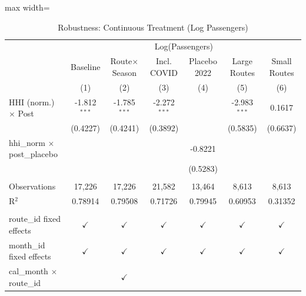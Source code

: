 
\begin{table}[htbp]
   \caption{\label{tab:robust} Robustness: Continuous Treatment (Log Passengers)}
   \bigskip
   \centering
   \begin{adjustbox}{max width=\textwidth}
   \begin{tabular}{lcccccc}
      \toprule
       & \multicolumn{6}{c}{Log(Passengers)}\\
                                          & Baseline       & Route$\times$Season  & Incl. COVID    & Placebo 2022  & Large Routes   & Small Routes \\   
                                          & (1)            & (2)                  & (3)            & (4)           & (5)            & (6)\\  
      \midrule 
      HHI (norm.) $\times$ Post           & -1.812$^{***}$ & -1.785$^{***}$       & -2.272$^{***}$ &               & -2.983$^{***}$ & 0.1617\\   
                                          & (0.4227)       & (0.4241)             & (0.3892)       &               & (0.5835)       & (0.6637)\\   
      hhi\_norm $\times$ post\_placebo    &                &                      &                & -0.8221       &                &   \\   
                                          &                &                      &                & (0.5283)      &                &   \\   
       \\
      Observations                        & 17,226         & 17,226               & 21,582         & 13,464        & 8,613          & 8,613\\  
      R$^2$                               & 0.78914        & 0.79508              & 0.71726        & 0.79945       & 0.60953        & 0.31352\\  
       \\
      route\_id fixed effects             & $\checkmark$   & $\checkmark$         & $\checkmark$   & $\checkmark$  & $\checkmark$   & $\checkmark$\\   
      month\_id fixed effects             & $\checkmark$   & $\checkmark$         & $\checkmark$   & $\checkmark$  & $\checkmark$   & $\checkmark$\\   
      cal\_month $\times $ route\_id      &                & $\checkmark$         &                &               &                & \\  
      \bottomrule
   \end{tabular}
   \end{adjustbox}


\end{table}
